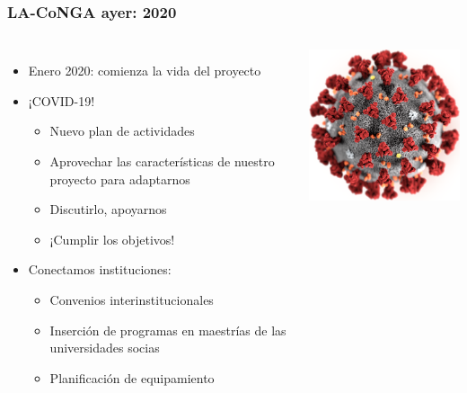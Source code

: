 \begin{frame}[fragile]
\frametitle{LA-CoNGA ayer: 2020}
\begin{columns}[c] %

\begin{itemize}
	\item Enero 2020: comienza la vida del proyecto
	\item ¡COVID-19!
	\begin{itemize}
		\item Nuevo plan de actividades
		\item Aprovechar las características de nuestro proyecto para adaptarnos
		\item Discutirlo, apoyarnos
		\item ¡Cumplir los objetivos!
		\end{itemize}
	\item Conectamos instituciones:
	\begin{itemize}
		\item Convenios interinstitucionales
		\item Inserción de programas en maestrías de las universidades socias
		\item Planificación de equipamiento
		\end{itemize}	
	\end{itemize}
\begin{center}
\includegraphics[scale=0.6]{imagenes/SARS-CoV-2_CDC-23312.png}
\end{center}

\end{columns}
\end{frame}


